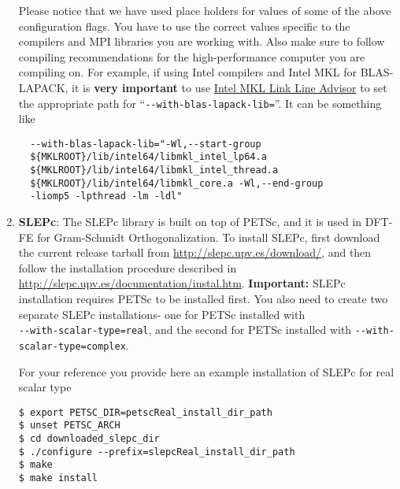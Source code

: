 \begin{enumerate}
Please notice that we have used place holders for values of some of the above configuration flags. You have to use the correct values specific to the compilers and MPI libraries you are working with. Also make sure to follow compiling recommendations for the high-performance computer you are compiling on. For example, if using Intel compilers and Intel MKL for BLAS-LAPACK, it is {\bf very important} to use \href{https://software.intel.com/en-us/articles/intel-mkl-link-line-advisor}{Intel MKL Link Line Advisor} to set the appropriate path for ``\verb|--with-blas-lapack-lib=|''. It can be something like
\begin{verbatim}
  --with-blas-lapack-lib="-Wl,--start-group 
  ${MKLROOT}/lib/intel64/libmkl_intel_lp64.a 
  ${MKLROOT}/lib/intel64/libmkl_intel_thread.a 
  ${MKLROOT}/lib/intel64/libmkl_core.a -Wl,--end-group
  -liomp5 -lpthread -lm -ldl" 
\end{verbatim}

\item {\bf SLEPc}: The SLEPc library is built on top of PETSc, and it is used in DFT-FE for Gram-Schmidt Orthogonalization. To install SLEPc, first download the current release tarball from \url{http://slepc.upv.es/download/}, and then follow the installation procedure described in \url{http://slepc.upv.es/documentation/instal.htm}. {\bf Important: } SLEPc installation requires PETSc to be installed first. You also need to create two separate SLEPc installations- one for PETSc installed with \\\verb|--with-scalar-type=real|, and the second for PETSc installed with \verb|--with-scalar-type=complex|. 
	
For your reference you provide here an example installation of SLEPc for real scalar type
\begin{verbatim}
$ export PETSC_DIR=petscReal_install_dir_path
$ unset PETSC_ARCH
$ cd downloaded_slepc_dir
$ ./configure --prefix=slepcReal_install_dir_path
$ make
$ make install
\end{verbatim}


\end{enumerate}
